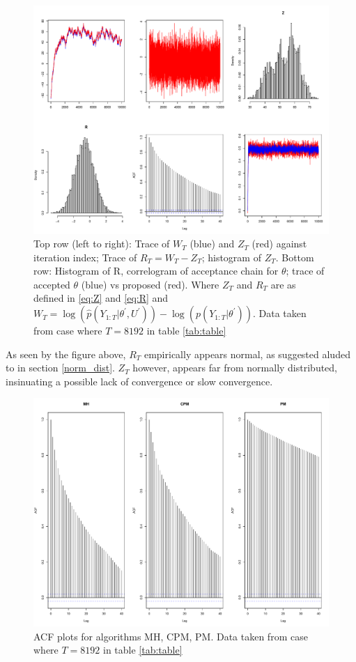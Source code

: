 \documentclass{article}
\begin{document}
\begin{figure}[H]
  \centerline{\includegraphics[scale=1]{experi1_plots}}
  \label{fig:theFig}
  \caption{Top row (left to right): Trace of $W_T$ (blue) and $Z_T$ (red) against iteration index; Trace of $R_T=W_T-Z_T$; histogram of $Z_T$.  Bottom row: Histogram of R, correlogram of acceptance chain for $\theta$; trace of accepted $\theta$ (blue) vs proposed (red). Where $Z_T$ and $R_T$ are as defined in \eqref{eq:Z} and \eqref{eq:R} and $W_T = \log(\hat{p}(Y_{1:T}| \theta^\prime, U^\prime)) - \log(p(Y_{1:T}|\theta^\prime))$. Data taken from case where $T=8192$ in table \ref{tab:table}}
\end{figure}

As seen by the figure above, $R_T$ empirically appears normal, as suggested aluded to in section \ref{norm_dist}. $Z_T$ however, appears far from normally distributed, insinuating a possible lack of convergence or slow convergence.

\begin{figure}[H]
  \centerline{\includegraphics[scale=1]{acf_plots}}
  \label{fig:acf}
  \caption{ACF plots for algorithms MH, CPM, PM. Data taken from case where $T=8192$ in table \ref{tab:table}}
\end{figure}
\end{document}
